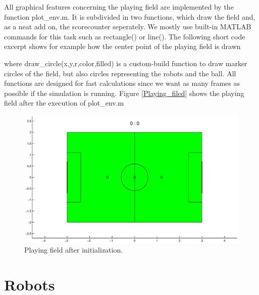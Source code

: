All graphical features concerning the playing field are implemented by the function {\selectfont plot\_env.m}. It is subdivided in two functions, which draw the field and, as a neat add on, the scorecounter seperately. We mostly use built-in MATLAB commands for this task such as {\selectfont rectangle()} or {\selectfont line()}. The following short code excerpt shows for example how the center point of the playing field is drawn


\parskip 20pt

where {\selectfont draw\_circle(x,y,r,color,filled)} is a custom-build function to draw marker circles of the field, but also circles representing the robots and the ball. All functions are designed for fast calculations since we want as many frames as possible if the simulation is running. Figure \ref{Playing_filed} shows the playing field after the execution of {\selectfont plot\_env.m}
\parskip 10pt

\begin{figure}[htbp]
	\centering
    	\includegraphics[width=12cm]{./2_Simulation/playing_field}
  	\caption{Playing field after initialization.}
  	\label{Playing_field}
\end{figure}


\section{Robots}

